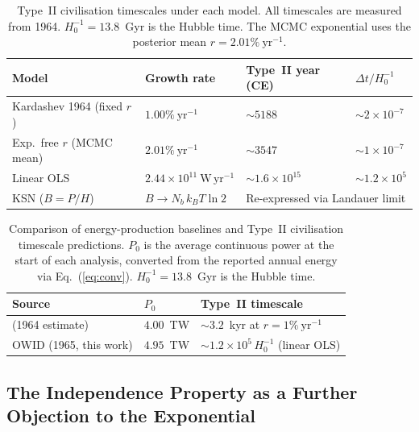 \begin{table}[htbp]
\centering
\caption{Type~II civilisation timescales under each model. All timescales are measured
from 1964. $H_0^{-1}=13.8$~Gyr is the Hubble time. The MCMC exponential uses the
posterior mean $r=2.01\%~\mathrm{yr^{-1}}$.}
\label{tab:timescales}
\begin{tabular}{@{}llll@{}}
\hline
Model & Growth rate & Type~II year (CE) & $\Delta t/H_0^{-1}$ \\
\hline
Kardashev 1964 (fixed $r$)   & $1.00\%~\mathrm{yr^{-1}}$            & $\sim 5188$           & $\sim 2\times10^{-7}$ \\
Exp.\ free $r$ (MCMC mean)   & $2.01\%~\mathrm{yr^{-1}}$            & $\sim 3547$           & $\sim 1\times10^{-7}$ \\
Linear OLS                   & $2.44\times10^{11}~\mathrm{W\,yr^{-1}}$ & $\sim 1.6\times10^{15}$ & $\sim 1.2\times10^{5}$ \\
KSN ($B=P/H$)                & $B\to N_b\,k_B T\ln 2$                    & \multicolumn{2}{l}{Re-expressed via Landauer limit} \\
\hline
\end{tabular}
\end{table}

\begin{table}[htbp]
\centering
\caption{Comparison of energy-production baselines and Type~II civilisation timescale
predictions. $P_0$ is the average continuous power at the start of each analysis,
converted from the reported annual energy via Eq.~(\ref{eq:conv}). $H_0^{-1}=13.8$~Gyr is
the Hubble time.}
\label{tab:baselines}
\begin{tabular}{@{}lll@{}}
\hline
Source & $P_0$ & Type~II timescale \\
\hline
\citet{Kardashev1964} (1964 estimate)        & $4.00$~TW & $\sim 3.2$~kyr at $r=1\%~\mathrm{yr^{-1}}$ \\
OWID \citep{Ritchie2022} (1965, this work)   & $4.95$~TW & $\sim 1.2\times10^{5}\,H_0^{-1}$ (linear OLS) \\
\hline
\end{tabular}
\end{table}

\subsection{The Independence Property as a Further Objection to the Exponential}
\label{sec:independence}

